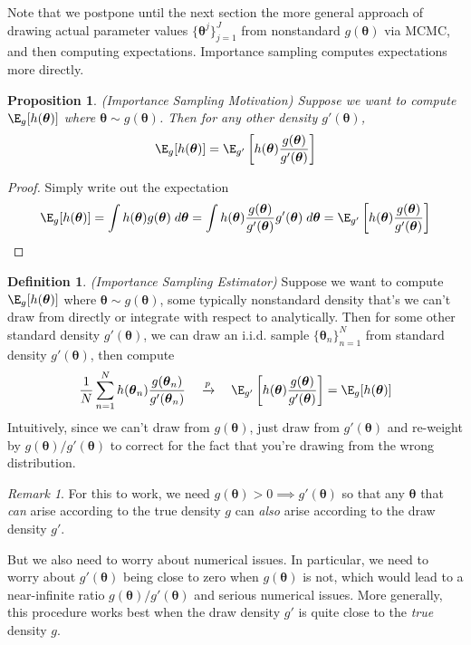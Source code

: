 \documentclass[12pt]{article}
\theoremstyle{plain}
\newtheorem{prop}[thm]{Proposition}
\theoremstyle{definition}
\newtheorem{defn}[thm]{Definition}
\theoremstyle{remark}
\newtheorem*{rmk}{Remark}
\newcommand{\bstheta}{\boldsymbol{\theta}}
\newcommand{\pto}{\xrightarrow{p}}
\newcommand{\sumnN}{\sum^N_{n=1}}
\begin{document}
Note that we postpone until the next section the more general approach
of drawing actual parameter values $\{\bstheta^j\}_{j=1}^J$ from
nonstandard $g(\bstheta)$ via MCMC, and then computing expectations.
Importance sampling computes expectations more directly.

\begin{prop}\emph{(Importance Sampling Motivation)}
Suppose we want to compute $\E_g[h(\bstheta)]$ where $\bstheta\sim g(\bstheta)$.
Then for any other density $g'(\bstheta)$,
\begin{align*}
  \E_g[h(\bstheta)]
  =
  \E_{g'}\left[
    h(\bstheta)
    \frac{g(\bstheta)}{g'(\bstheta)}
  \right]
\end{align*}
\end{prop}
\begin{proof}
Simply write out the expectation
\begin{align*}
  \E_g[h(\bstheta)]
  =
  \int
  h(\bstheta)g(\bstheta)
  \; d\bstheta
  =
  \int
  h(\bstheta)
  \frac{g(\bstheta)}{g'(\bstheta)}
  g'(\bstheta)
  \; d\bstheta
  =
  \E_{g'}\left[
    h(\bstheta)
    \frac{g(\bstheta)}{g'(\bstheta)}
  \right]
\end{align*}
\end{proof}


\begin{defn}\emph{(Importance Sampling Estimator)}
Suppose we want to compute $\E_g[h(\bstheta)]$ where $\bstheta\sim g(\bstheta)$,
some typically nonstandard density that's we can't draw from directly or
integrate with respect to analytically.
Then for some other standard density $g'(\bstheta)$, we can draw an
i.i.d.  sample $\{\bstheta_n\}_{n=1}^N$ from standard density
$g'(\bstheta)$, then compute
\begin{align*}
  \frac{1}{N}\sumnN
  h(\bstheta_n)
  \frac{g(\bstheta_n)}{g'(\bstheta_n)}
  \quad\pto\quad
  \E_{g'}\left[
    h(\bstheta)
    \frac{g(\bstheta)}{g'(\bstheta)}
  \right]
  =
  \E_g[h(\bstheta)]
\end{align*}
Intuitively, since we can't draw from $g(\bstheta)$, just draw from
$g'(\bstheta)$ and re-weight by $g(\bstheta)/g'(\bstheta)$ to correct
for the fact that you're drawing from the wrong distribution.
\end{defn}
\begin{rmk}
For this to work, we need $g(\bstheta)>0 \implies g'(\bstheta)$ so that
any $\bstheta$ that \emph{can} arise according to the true density $g$
can \emph{also} arise according to the draw density $g'$.

But we also need to worry about numerical issues. In particular, we need
to worry about $g'(\bstheta)$ being close to zero when $g(\bstheta)$ is
not, which would lead to a near-infinite ratio
$g(\bstheta)/g'(\bstheta)$ and serious numerical issues.
More generally, this procedure works best when the draw density
$g'$ is quite close to the \emph{true} density $g$.
\end{rmk}
\end{document}
